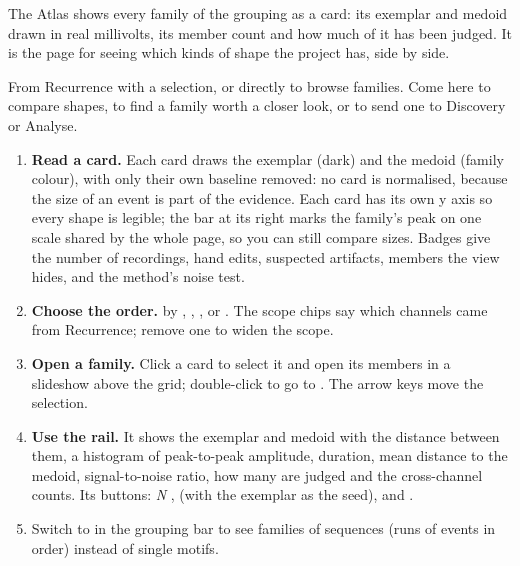 The Atlas shows every family of the grouping as a card: its exemplar and medoid drawn in real
millivolts, its member count and how much of it has been judged. It is the page for seeing
which kinds of shape the project has, side by side.

From Recurrence with a selection, or directly to browse families. Come here to compare
shapes, to find a family worth a closer look, or to send one to Discovery or Analyse.


\begin{enumerate}
  \item \textbf{Read a card.} Each card draws the exemplar (dark) and the medoid (family
    colour), with only their own baseline removed: no card is normalised, because the size
    of an event is part of the evidence. Each card has its own y axis so every shape is
    legible; the bar at its right marks the family's peak on one scale shared by the whole
    page, so you can still compare sizes. Badges give the number of recordings, hand edits,
    suspected artifacts, members the view hides, and the method's noise test.
  \item \textbf{Choose the order.}  by , ,
    ,  or . The scope chips say which
    channels came from Recurrence; remove one to widen the scope.
  \item \textbf{Open a family.} Click a card to select it and open its members in a
    slideshow above the grid; double-click to go to . The arrow keys
    move the selection.
  \item \textbf{Use the rail.} It shows the exemplar and medoid with the distance between
    them, a histogram of peak-to-peak amplitude, duration, mean distance to the medoid,
    signal-to-noise ratio, how many are judged and the cross-channel counts. Its buttons:
     \emph{N} ,  (with the exemplar as
    the seed), and .
  \item Switch to  in the grouping bar to see families of sequences (runs of
    events in order) instead of single motifs.
\end{enumerate}

